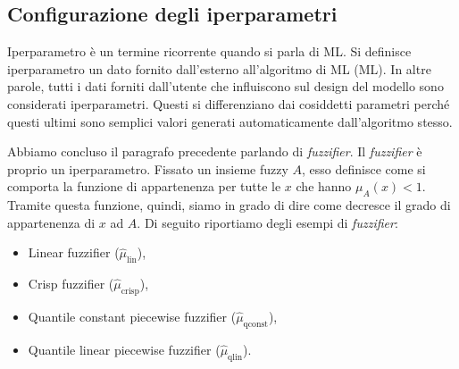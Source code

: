 \documentclass[12pt,italian]{report}
\begin{document}

\subsection{Configurazione degli iperparametri}

Iperparametro è un termine ricorrente quando si parla di ML. Si definisce iperparametro un dato fornito dall'esterno all'algoritmo di ML (ML). In altre parole, tutti i dati forniti dall'utente che influiscono sul design del modello sono considerati iperparametri. Questi si differenziano dai cosiddetti parametri perché questi ultimi sono semplici valori generati automaticamente dall'algoritmo stesso.

Abbiamo concluso il paragrafo precedente parlando di \emph{fuzzifier}. Il \emph{fuzzifier} è proprio un iperparametro. Fissato un insieme fuzzy $A$, esso definisce come si comporta la funzione di appartenenza per tutte le $x$ che hanno $ \mu_{A}(x) < 1 $. Tramite questa funzione, quindi, siamo in grado di dire come decresce il grado di appartenenza di $x$ ad $A$. Di seguito riportiamo degli esempi di \emph{fuzzifier}:

\begin{itemize}
	\item Linear fuzzifier ($\hat\mu_{\text{lin}}$),
	\item Crisp fuzzifier ($\hat\mu_{\text{crisp}}$),
	\item Quantile constant piecewise fuzzifier ($\hat\mu_{\text{qconst}}$),
	\item Quantile linear piecewise fuzzifier ($\hat \mu_{\text{qlin}}$).
\end{itemize}
\end{document}
